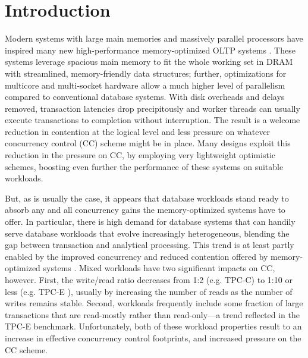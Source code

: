 
\section{Introduction}

Modern systems with large main memories and massively parallel processors have inspired many new high-performance memory-optimized OLTP systems \cite{Kallman+08,PandisJHA10,KemperN11,LarsonBDFPZ11,TuZKLM13}. These systems leverage spacious main memory to fit the whole working set in DRAM with streamlined, memory-friendly data structures; further, optimizations for multicore and multi-socket hardware allow a much higher level of parallelism compared to conventional database systems. With disk overheads and delays removed, transaction latencies drop precipitously and worker threads can usually execute transactions to completion without interruption. The result is a welcome reduction in contention at the logical level and less pressure on whatever concurrency control (CC) scheme might be in place.
Many designs exploit this reduction in the pressure on CC, by employing very lightweight optimistic schemes, boosting even further the performance of these systems on suitable workloads.


But, as is usually the case, it appears that database workloads stand ready to absorb any and all concurrency gains the memory-optimized systems have to offer. In particular, there is high demand for database systems that can handily serve database workloads that evolve increasingly heterogeneous, blending the gap between transaction and analytical processing. This trend is at least partly enabled by the improved concurrency and reduced contention offered by memory-optimized systems \cite{Farber+12}. Mixed workloads have two significant impacts on CC, however. First, the write/read ratio decreases from 1:2 (e.g. TPC-C) to 1:10 or less (e.g. TPC-E \cite{Chen+10,TozunPKJA13}), usually by increasing the number of reads as the number of writes remains stable. 
Second, workloads frequently include some fraction of large transactions that are read-mostly rather than read-only---a trend reflected in the TPC-E benchmark. Unfortunately, both of these workload properties result to an increase in effective concurrency control footprints, and increased pressure on the CC scheme. 

